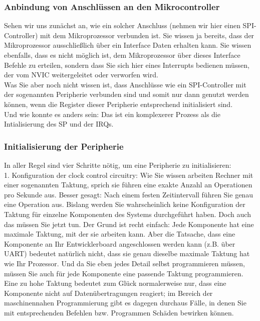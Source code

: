 \subsubsection{Anbindung von Anschlüssen an den Mikrocontroller}

Sehen wir uns zunächst an, wie ein solcher Anschluss (nehmen wir hier einen SPI-Controller) mit dem Mikroprozessor verbunden ist. Sie wissen ja bereits, dass der Mikroprozessor ausschließlich über ein Interface Daten erhalten kann. Sie wissen ebenfalls, dass es nicht möglich ist, dem Mikroprozessor über dieses Interface Befehle zu erteilen, sondern dass Sie sich hier eines Interrupts bedienen müssen, der vom NVIC weitergeleitet oder verworfen wird.\\

Was Sie aber noch nicht wissen ist, dass Anschlüsse wie ein SPI-Controller mit der sogenannten Peripherie verbunden sind und somit nur dann genutzt werden können, wenn die Register dieser Peripherie entsprechend initialisiert sind.\\

Und wie konnte es anders sein: Das ist ein komplexerer Prozess als die Intialisierung des SP und der IRQs.

\subsubsection{Initialisierung der Peripherie}

In aller Regel sind vier Schritte nötig, um eine Peripherie zu initialisieren:\\

1.	Konfiguration der clock control circuitry:
Wie Sie wissen arbeiten Rechner mit einer sogenannten Taktung, sprich sie führen eine exakte Anzahl an Operationen pro Sekunde aus. Besser gesagt: Nach einem festen Zeitintervall führen Sie genau eine Operation aus. Bislang werden Sie wahrscheinlich keine Konfiguration der Taktung für einzelne Komponenten des Systems durchgeführt haben. Doch auch das müssen Sie jetzt tun.
Der Grund ist recht einfach: Jede Komponente hat eine maximale Taktung, mit der sie arbeiten kann. Aber die Tatsache, dass eine Komponente an Ihr Entwicklerboard angeschlossen werden kann (z.B. über UART) bedeutet natürlich nicht, dass sie genau dieselbe maximale Taktung hat wie Ihr Prozessor. Und da Sie eben jedes Detail selbst programmieren müssen, müssen Sie auch für jede Komponente eine passende Taktung programmieren.
Eine zu hohe Taktung bedeutet zum Glück normalerweise nur, dass eine Komponente nicht auf Datenübertragungen reagiert; im Bereich der maschinennahen Programmierung gibt es dagegen durchaus Fälle, in denen Sie mit entsprechenden Befehlen bzw. Programmen Schäden bewirken können.\\

